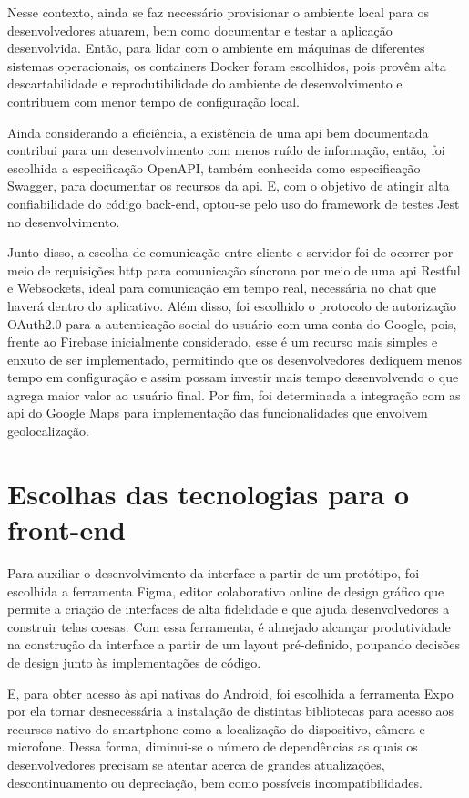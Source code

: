 Nesse contexto, ainda se faz necessário provisionar o ambiente local para os desenvolvedores atuarem, bem como documentar e testar a aplicação desenvolvida. Então, para lidar com o ambiente em máquinas de diferentes sistemas operacionais, os containers Docker foram escolhidos, pois provêm alta descartabilidade e reprodutibilidade do ambiente de desenvolvimento e contribuem com menor tempo de configuração local. 

Ainda considerando a eficiência, a existência de uma \ac{api} bem documentada contribui para um desenvolvimento com menos ruído de informação, então, foi escolhida a especificação OpenAPI, também conhecida como especificação Swagger, para documentar os recursos da \ac{api}. E, com o objetivo de atingir alta confiabilidade do código back-end, optou-se pelo uso do framework de testes Jest no desenvolvimento.

Junto disso, a escolha de comunicação entre cliente e servidor foi de ocorrer por meio de requisições \ac{http} para comunicação síncrona por meio de uma \ac{api} Restful e Websockets, ideal para comunicação em tempo real, necessária no chat que haverá dentro do aplicativo. 
Além disso, foi escolhido o protocolo de autorização OAuth2.0 para a autenticação social do usuário com uma conta do Google, pois, frente ao Firebase inicialmente considerado, esse é um recurso mais simples e enxuto de ser implementado, permitindo que os desenvolvedores dediquem menos tempo em configuração e assim possam investir mais tempo desenvolvendo o que agrega maior valor ao usuário final. Por fim, foi determinada a integração com as \ac{api} do Google Maps para implementação das funcionalidades que envolvem geolocalização. 


\section{Escolhas das tecnologias para o front-end}
Para auxiliar o desenvolvimento da interface a partir de um  protótipo, foi escolhida a ferramenta Figma, editor colaborativo online de design gráfico que permite a criação de interfaces de alta fidelidade e que ajuda desenvolvedores a construir telas coesas. Com essa ferramenta, é almejado alcançar produtividade na construção da interface a partir de um layout pré-definido, poupando decisões de design junto às implementações de código.

E, para obter acesso às \ac{api} nativas do Android, foi escolhida a ferramenta Expo por ela tornar desnecessária a instalação de distintas bibliotecas para acesso aos recursos nativo do smartphone como a localização do dispositivo, câmera e microfone. Dessa forma, diminui-se o número de dependências as quais os desenvolvedores precisam se atentar acerca de grandes atualizações, descontinuamento ou depreciação, bem como possíveis incompatibilidades.

